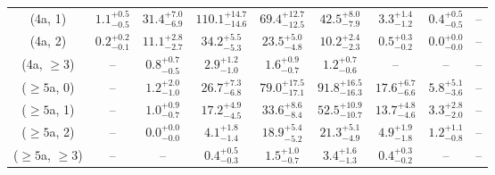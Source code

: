 \begin{table}[h!]
{\begin{tabular}{ccccccccc}
	(4a, 1) & $1.1^{+ 0.5 }_{- 0.5 }$ & $31.4^{+ 7.0 }_{- 6.9 }$ & $110.1^{+ 14.7 }_{- 14.6 }$ & $69.4^{+ 12.7 }_{- 12.5 }$ & $42.5^{+ 8.0 }_{- 7.9 }$ & $3.3^{+ 1.4 }_{- 1.2 }$ & $0.4^{+ 0.5 }_{- 0.5 }$ & -- \\[0.5ex] 
	(4a, 2) & $0.2^{+ 0.2 }_{- 0.1 }$ & $11.1^{+ 2.8 }_{- 2.7 }$ & $34.2^{+ 5.5 }_{- 5.3 }$ & $23.5^{+ 5.0 }_{- 4.8 }$ & $10.2^{+ 2.4 }_{- 2.3 }$ & $0.5^{+ 0.3 }_{- 0.2 }$ & $0.0^{+ 0.0 }_{- 0.0 }$ & -- \\[0.5ex] 
	(4a, $\ge3$) & -- & $0.8^{+ 0.7 }_{- 0.5 }$ & $2.9^{+ 1.2 }_{- 1.0 }$ & $1.6^{+ 0.9 }_{- 0.7 }$ & $1.2^{+ 0.7 }_{- 0.6 }$ & -- & -- & -- \\[0.5ex] 
	($\ge5$a, 0) & -- & $1.2^{+ 2.0 }_{- 1.0 }$ & $26.7^{+ 7.3 }_{- 6.8 }$ & $79.0^{+ 17.5 }_{- 17.1 }$ & $91.8^{+ 16.5 }_{- 16.3 }$ & $17.6^{+ 6.7 }_{- 6.6 }$ & $5.8^{+ 5.1 }_{- 3.6 }$ & -- \\[0.5ex] 
	($\ge5$a, 1) & -- & $1.0^{+ 0.9 }_{- 0.7 }$ & $17.2^{+ 4.9 }_{- 4.5 }$ & $33.6^{+ 8.6 }_{- 8.4 }$ & $52.5^{+ 10.9 }_{- 10.7 }$ & $13.7^{+ 4.8 }_{- 4.6 }$ & $3.3^{+ 2.8 }_{- 2.0 }$ & -- \\[0.5ex] 
	($\ge5$a, 2) & -- & $0.0^{+ 0.0 }_{- 0.0 }$ & $4.1^{+ 1.8 }_{- 1.4 }$ & $18.9^{+ 5.4 }_{- 5.2 }$ & $21.3^{+ 5.1 }_{- 4.9 }$ & $4.9^{+ 1.9 }_{- 1.8 }$ & $1.2^{+ 1.1 }_{- 0.8 }$ & -- \\[0.5ex] 
	($\ge5$a, $\ge3$) & -- & -- & $0.4^{+ 0.5 }_{- 0.3 }$ & $1.5^{+ 1.0 }_{- 0.7 }$ & $3.4^{+ 1.6 }_{- 1.3 }$ & $0.4^{+ 0.3 }_{- 0.2 }$ & -- & -- \\[0.5ex] 
	\hline
	\hline
\end{tabular}}
\end{table}
